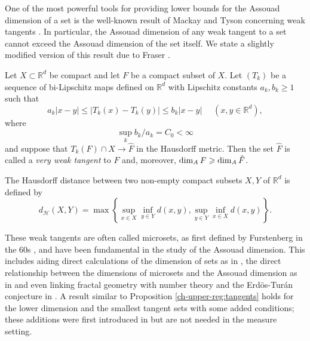 One of the most powerful tools for providing lower bounds for the Assouad dimension of a set is the well-known result of Mackay and Tyson concerning weak tangents \cite[Proposition 6.1.5]{mackaytyson}. In particular, the Assouad dimension of any weak tangent to a set cannot exceed the Assouad dimension of the set itself. We state a slightly modified version of this result due to Fraser \cite[Proposition 7.7]{Fr}. 
\begin{proposition}\label{ch-upper-reg:tangents}
Let $X\subset \mathbb{R}^d$ be compact and let $F$ be a compact subset of $X$. Let $(T_k)$ be a sequence of bi-Lipschitz maps defined on $\mathbb{R}^d$ with Lipschitz constants $a_k, b_k \ge 1$ such that 
\[
a_k \lvert x - y \rvert \leq \lvert T_k(x) - T_k(y) \rvert \leq b_k \lvert x - y \rvert  \,\,\,\,\,\,\,\, (x,y\in\mathbb{R}^d),
\]
where
\[
\sup_k b_k / a_k = C_0 <\infty
\]
and suppose that $T_k(F) \cap X \rightarrow \hat{F}$ in the Hausdorff metric. Then the set $\hat F$ is called a \emph{very weak tangent} to $F$ and, moreover,  $\dim_{\text{\emph{A}}} F \geq \dim_{\text{\emph{A}}} \hat{F}$.
\end{proposition}
The Hausdorff distance between two non-empty compact subsets $X,Y$ of $\mathbb{R}^d$ is defined by
\[
d_{\mathcal{H}}(X,Y) = \max\left\{\sup_{x\in X} \inf_{y \in Y} d(x,y), \sup_{y\in Y} \inf_{x \in X} d(x,y)\right\}.
\]


These weak tangents are often called microsets, as first defined by Furstenberg in the 60s \cite{furstenberg70, furstenberg}, and have been fundamental in the study of the Assouad dimension. This includes aiding direct calculations of the dimension of sets as in \cite{fraser-howroyd1}, the direct relationship between the dimensions of microsets and the Assouad dimension as in \cite{kaenmaki-assouad, microsets} and even linking fractal geometry with number theory and the Erd\"os-Tur\'an conjecture in \cite{FY}. A result similar to Proposition \ref{ch-upper-reg:tangents} holds for the lower dimension and the smallest tangent sets with some added conditions; these additions were first introduced in \cite{Fr} but are not needed in the measure setting.


